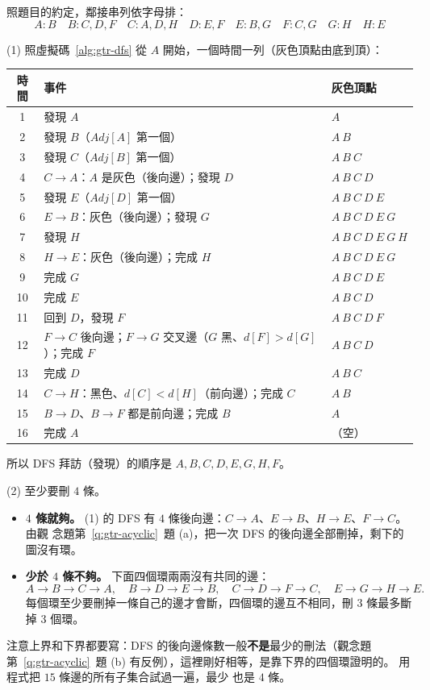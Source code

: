 照題目的約定，鄰接串列依字母排：
\[
A\colon B \quad B\colon C, D, F \quad C\colon A, D, H \quad D\colon E, F \quad
E\colon B, G \quad F\colon C, G \quad G\colon H \quad H\colon E
\]

(1) 照虛擬碼~\ref{alg:gtr-dfs} 從 $A$ 開始，一個時間一列（灰色頂點由底到頂）：

\begin{center}
\small
\begin{tabular}{cll}
\toprule
時間 & 事件 & 灰色頂點 \\
\midrule
1 & 發現 $A$ & $A$ \\
2 & 發現 $B$（$\mathit{Adj}[A]$ 第一個） & $A\ B$ \\
3 & 發現 $C$（$\mathit{Adj}[B]$ 第一個） & $A\ B\ C$ \\
4 & $C \to A$：$A$ 是灰色（後向邊）；發現 $D$ & $A\ B\ C\ D$ \\
5 & 發現 $E$（$\mathit{Adj}[D]$ 第一個） & $A\ B\ C\ D\ E$ \\
6 & $E \to B$：灰色（後向邊）；發現 $G$ & $A\ B\ C\ D\ E\ G$ \\
7 & 發現 $H$ & $A\ B\ C\ D\ E\ G\ H$ \\
8 & $H \to E$：灰色（後向邊）；完成 $H$ & $A\ B\ C\ D\ E\ G$ \\
9 & 完成 $G$ & $A\ B\ C\ D\ E$ \\
10 & 完成 $E$ & $A\ B\ C\ D$ \\
11 & 回到 $D$，發現 $F$ & $A\ B\ C\ D\ F$ \\
12 & $F \to C$ 後向邊；$F \to G$ 交叉邊（$G$ 黑、$d[F] > d[G]$）；完成 $F$ & $A\ B\ C\ D$ \\
13 & 完成 $D$ & $A\ B\ C$ \\
14 & $C \to H$：黑色、$d[C] < d[H]$（前向邊）；完成 $C$ & $A\ B$ \\
15 & $B \to D$、$B \to F$ 都是前向邊；完成 $B$ & $A$ \\
16 & 完成 $A$ & （空） \\
\bottomrule
\end{tabular}
\end{center}

所以 DFS 拜訪（發現）的順序是 $A, B, C, D, E, G, H, F$。

(2) 至少要刪 $4$ 條。
\begin{itemize}
\item \textbf{$4$ 條就夠。} (1) 的 DFS 有 $4$ 條後向邊：$C \to A$、$E \to B$、$H \to E$、$F \to C$。 由觀
念題第~\ref{q:gtr-acyclic}~題 (a)，把一次 DFS 的後向邊全部刪掉，剩下的圖沒有環。
\item \textbf{少於 $4$ 條不夠。} 下面四個環兩兩沒有共同的邊：
\[
A \to B \to C \to A,\quad B \to D \to E \to B,\quad C \to D \to F \to C,\quad E \to G \to H \to E.
\]
每個環至少要刪掉一條自己的邊才會斷，四個環的邊互不相同，刪 $3$ 條最多斷掉 $3$ 個環。
\end{itemize}
注意上界和下界都要寫：DFS 的後向邊條數一般\textbf{不是}最少的刪法（觀念題第~\ref{q:gtr-acyclic}~題
(b) 有反例），這裡剛好相等，是靠下界的四個環證明的。 用程式把 $15$ 條邊的所有子集合試過一遍，最少
也是 $4$ 條。

